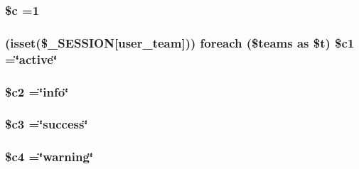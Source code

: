 \subsubsection[{\$c}]{\setlength{\rightskip}{0pt plus 5cm}\${\bf c} =1}\label{temporary_2_c_t_8php_ab73d7f4f2dae233dd561e7fdaab3a77b}
\hypertarget{temporary_2_c_t_8php_a19a60f61607211ec9bd8685cf9949285}{}
\subsubsection[{\$c1}]{ (isset(\$\+\_\+\+S\+E\+S\+S\+I\+O\+N\mbox{[}\textquotesingle{}user\+\_\+team\textquotesingle{}\mbox{]})) {\bf foreach} (\$teams as \$t) \$c1 =\char`\"{}active\char`\"{}}\label{temporary_2_c_t_8php_a19a60f61607211ec9bd8685cf9949285}
\hypertarget{temporary_2_c_t_8php_a7d0ce9eb4b126a1a12c7dade4f7ab7ef}{}
\subsubsection[{\$c2}]{\setlength{\rightskip}{0pt plus 5cm}\$c2 =\char`\"{}info\char`\"{}}\label{temporary_2_c_t_8php_a7d0ce9eb4b126a1a12c7dade4f7ab7ef}
\hypertarget{temporary_2_c_t_8php_a78a28e488f33dbd56e562b07dc3862e3}{}
\subsubsection[{\$c3}]{\setlength{\rightskip}{0pt plus 5cm}\$c3 =\char`\"{}success\char`\"{}}\label{temporary_2_c_t_8php_a78a28e488f33dbd56e562b07dc3862e3}
\hypertarget{temporary_2_c_t_8php_a480a6698b6eb8bfee885295be554a1e7}{}
\subsubsection[{\$c4}]{\setlength{\rightskip}{0pt plus 5cm}\$c4 =\char`\"{}warning\char`\"{}}\label{temporary_2_c_t_8php_a480a6698b6eb8bfee885295be554a1e7}
\hypertarget{temporary_2_c_t_8php_ad07a0ce016744e189c6f98b13c96812c}{}
